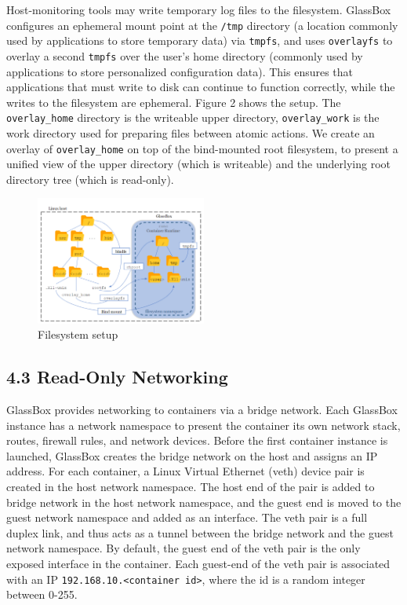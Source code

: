 \documentclass{proc}
\begin{document}
Host-monitoring tools may write temporary log files to the filesystem. GlassBox configures an ephemeral mount point at the \texttt{/tmp} directory (a location commonly used by applications to store temporary data) via \texttt{tmpfs}, and uses \texttt{overlayfs} to overlay a second \texttt{tmpfs} over the user's home directory (commonly used by applications to store personalized configuration data). This ensures that applications that must write to disk can continue to function correctly, while the writes to the filesystem are ephemeral. Figure 2 shows the setup. The \texttt{overlay\_home} directory is the writeable upper directory, \texttt{overlay\_work} is the work directory used for preparing files between atomic actions. We create an overlay of \texttt{overlay\_home} on top of the bind-mounted root filesystem, to present a unified view of the upper directory (which is writeable) and the underlying root directory tree (which is read-only).


\begin{figure}
\includegraphics[width=0.5\textwidth]{fs_diagram}
\caption{Filesystem setup}
\end{figure}

\subsection*{4.3 Read-Only Networking}

GlassBox provides networking to containers via a bridge network. Each GlassBox instance has a network namespace to present the container its own network stack, routes, firewall rules, and network devices. Before the first container instance is launched, GlassBox creates the bridge network on the host and assigns an IP address. For each container, a Linux Virtual Ethernet (veth) device pair is created in the host network namespace. The host end of the pair is added to bridge network in the host network namespace, and the guest end is moved to the guest network namespace and added as an interface. The veth pair is a full duplex link, and thus acts as a tunnel between the bridge network and the guest network namespace. By default, the guest end of the veth pair is the only exposed interface in the container. Each guest-end of the veth pair is associated with an IP \texttt{192.168.10.<container id>}, where the id is a random integer between 0-255.
\end{document}
